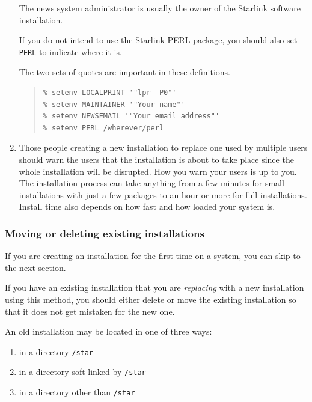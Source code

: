 \documentclass[twoside,11pt]{article}
\newcommand{\xlabel}[1]{}
\renewcommand{\_}{\texttt{\symbol{95}}}
\begin{document}
\begin{enumerate}
The news system administrator is usually the owner of the Starlink software
installation.

If you do not intend to use the Starlink PERL package, you should also 
set \texttt{PERL} to indicate where it is.

The two sets of quotes are important in these definitions.

\begin{quote}
\begin{verbatim}
% setenv LOCALPRINT '"lpr -P0"'
% setenv MAINTAINER '"Your name"'
% setenv NEWSEMAIL '"Your email address"'
% setenv PERL /wherever/perl
\end{verbatim}
\end{quote}

\item Those people creating a new installation to replace one used by
multiple users should warn the users that the installation is about to take
place since the whole installation will be disrupted.
How you warn your users is up to you.  The installation process can take
anything from a few minutes for small installations with just a few
packages to an hour or more for full installations.  Install time also
depends on how fast and how loaded your system is.

\end{enumerate}

\subsubsection{\xlabel{moving_or_deleting_existing_installations}Moving or deleting existing installations}
\label{moving_or_deleting_existing_installations}

If you are creating an installation for the first time on a system,
you can skip to the next section.

If you have an existing installation that you are \textit{replacing}
with a new installation using this method, you should either delete or
move the existing installation so that it does not get mistaken for the
new one.

An old installation may be located in one of three ways:

\begin{enumerate}
\item in a directory \texttt{/star}
\item in a directory soft linked by \texttt{/star}
\item in a directory other than \texttt{/star}
\end{enumerate}
\end{document}
